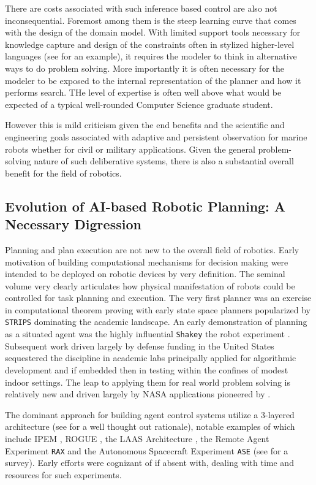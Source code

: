 There are costs associated with such inference based control are also
not inconsequential. Foremost among them is the steep learning curve
that comes with the design of the domain model. With limited support
tools necessary for knowledge capture and design of the constraints
often in stylized higher-level languages (see \cite{NDDL} for an
example), it requires the modeler to think in alternative ways to do
problem solving. More importantly it is often necessary for the
modeler to be exposed to the internal representation of the planner
and how it performs search. THe level of expertise is often well above
what would be expected of a typical well-rounded Computer Science
graduate student.

However this is mild criticism given the end benefits and the
scientific and engineering goals associated with adaptive and
persistent observation for marine robots whether for civil or military
applications. Given the general problem-solving nature of such
deliberative systems, there is also a substantial overall benefit for
the field of robotics.

\subsection{Evolution of AI-based Robotic Planning: A Necessary Digression}

Planning and plan execution are not new to the overall field of
robotics. Early motivation of building computational mechanisms for
decision making were intended to be deployed on robotic devices by
very definition. The seminal volume \cite{computersthought} very
clearly articulates how physical manifestation of robots could be
controlled for task planning and execution. The very first planner
\cite{green69} was an exercise in computational theorem proving with
early state space planners popularized by \texttt{STRIPS}
\cite{strips71} dominating the academic landscape. An early
demonstration of planning as a situated agent was the highly
influential \texttt{Shakey} the robot experiment
\cite{shakey84}. Subsequent work driven largely by defense funding in
the United States sequestered the discipline in academic labs
principally applied for algorithmic development and if embedded then
in testing within the confines of modest indoor settings. The leap to
applying them for real world problem solving is relatively new and
driven largely by NASA applications pioneered by \cite{mus94,mus98,
  jonsson00, rajan00, chien05, bresina05}.

The dominant approach for building agent control systems utilize a
$3$-layered architecture (see \cite{gat98} for a well thought out
rationale), notable examples of which include IPEM
\cite{AmbrosIngerson88}, ROGUE \cite{Haigh98}, the LAAS Architecture
\cite{alami:1998p820}, the Remote Agent Experiment \texttt{RAX}
\cite{mus98} and the Autonomous Spacecraft Experiment \texttt{ASE}
\cite{chien99} (see \cite{Knight01} for a survey). Early efforts were
cognizant of if absent with, dealing with time and resources for such
experiments. 

